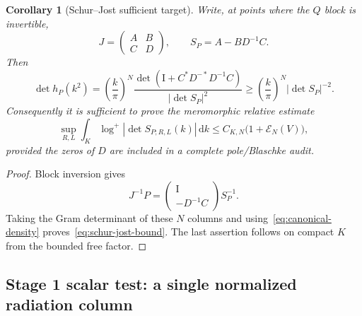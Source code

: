 \documentclass[11pt]{article}
\newcommand{\cE}{\mathcal E}
\newcommand{\Id}{\mathrm I}
\newcommand{\dd}{\,\mathrm d}
\newtheorem{corollary}[theorem]{Corollary}
\theoremstyle{definition}
\theoremstyle{remark}
\begin{document}
\begin{corollary}[Schur--Jost sufficient target]\label{cor:schur-jost}
Write, at points where the $Q$ block is invertible,
\begin{equation}
 J=\begin{pmatrix}A&B\\ C&D\end{pmatrix},
 \qquad S_P=A-BD^{-1}C.
 \label{eq:J-blocks}
\end{equation}
Then
\begin{equation}
 \det h_P(k^2)
 =\left(\frac{k}{\pi}\right)^N
 \frac{\det\!\left(\Id+C^*D^{-*}D^{-1}C\right)}{|\det S_P|^2}
 \geq\left(\frac{k}{\pi}\right)^N|\det S_P|^{-2}.
 \label{eq:schur-jost-bound}
\end{equation}
Consequently it is sufficient to prove the meromorphic relative estimate
\begin{equation}
 \sup_{R,L}\int_K\log^+|\det S_{P;R,L}(k)|\dd k
 \leq C_{K,N}\bigl(1+\cE_N(V)\bigr),
 \label{eq:schur-jost-target}
\end{equation}
provided the zeros of $D$ are included in a complete pole/Blaschke audit.
\end{corollary}

\begin{proof}
Block inversion gives
\begin{equation}
 J^{-1}P=
 \begin{pmatrix}\Id\\-D^{-1}C\end{pmatrix}S_P^{-1}.
\end{equation}
Taking the Gram determinant of these $N$ columns and using~\eqref{eq:canonical-density} proves~\eqref{eq:schur-jost-bound}.  The last assertion follows on compact $K$ from the bounded free factor.
\end{proof}

\subsection{Stage 1 scalar test: a single normalized radiation column}
\end{document}
